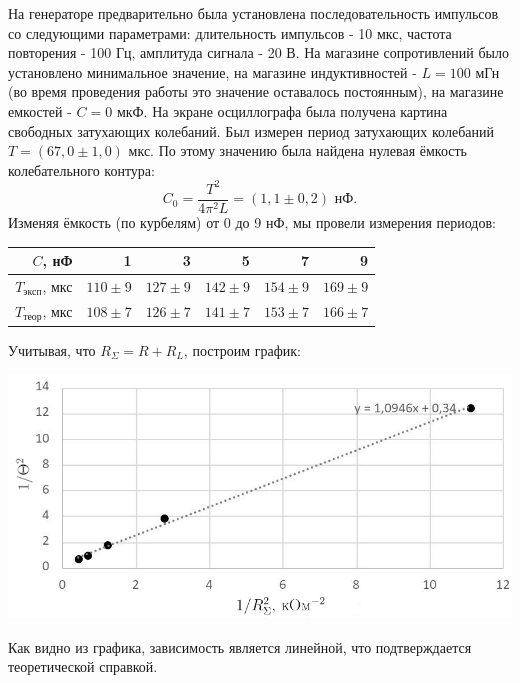 На генераторе предварительно была установлена последовательность импульсов со следующими параметрами: длительность импульсов - 10 мкс, частота повторения - 100 Гц, амплитуда сигнала - 20 В. На магазине сопротивлений было установлено минимальное значение, на магазине индуктивностей - $L = 100$ мГн (во время проведения работы это значение оставалось постоянным), на магазине емкостей - $C = 0$ мкФ. На экране осциллографа была получена картина свободных затухающих колебаний.
\n\n
Был измерен период затухающих колебаний $T = (67,0 \pm 1,0)$ мкс. По этому значению была найдена нулевая ёмкость колебательного контура:
\[ C_0 = \frac{T^2}{4 \pi^2 L} = (1,1 \pm 0,2) \text{ нФ.} \]
Изменяя ёмкость (по курбелям) от 0 до 9 нФ, мы провели измерения периодов:
\begin{table}[H]
\centering
\begin{tabular}{|r|r|r|r|r|r|}
\hline
$C$, нФ & 1 & 3 & 5 & 7 & 9 \\ \hline
$T_{\text{эксп}}$, мкс & $110 \pm 9$ & $127 \pm 9$ & $142 \pm 9$ & $154 \pm 9$ & $169 \pm 9$ \\ \hline
$T_{\text{теор}}$, мкс & $108 \pm 7$ & $126 \pm 7$ & $141 \pm 7$ & $153 \pm 7$ & $166 \pm 7$ \\ \hline
\end{tabular}
\end{table}
\n
Учитывая, что $R_{\Sigma} = R + R_{L}$, построим график:
\begin{center}
\includegraphics[scale=2]{6.jpg}
\end{center}
\n
Как видно из графика, зависимость является линейной, что подтверждается теоретической справкой.
